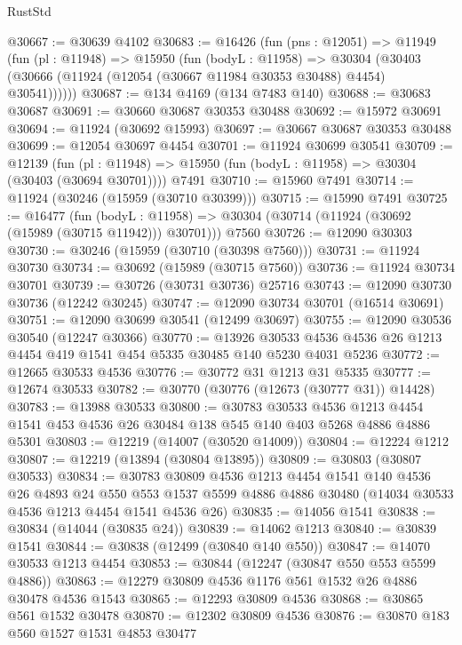 \begin{lexlean}{RustStd}
\begin{coremodule}
{\begin{coremodule}
{{{{{{{{{{{{{{{{{{{{{{{{{{{{{{{{{{{{{{{{{{{{{{{{{{{{{{{{{{{{{{{{{{{{{{{{{{{{{{{{@30667 := @30639 @4102
@30683 := @16426
    (fun (pns : @12051) =>
    @11949
      (fun (pl : @11948) =>
      @15950
        (fun (bodyL : @11958) =>
        @30304 (@30403 (@30666 (@11924 (@12054 (@30667 @11984 @30353 @30488) @4454) @30541))))))
@30687 := @134 @4169 (@134 @7483 @140)
@30688 := @30683 @30687
@30691 := @30660 @30687 @30353 @30488
@30692 := @15972 @30691
@30694 := @11924 (@30692 @15993)
@30697 := @30667 @30687 @30353 @30488
@30699 := @12054 @30697 @4454
@30701 := @11924 @30699 @30541
@30709 := @12139
    (fun (pl : @11948) => @15950 (fun (bodyL : @11958) => @30304 (@30403 (@30694 @30701))))
    @7491
@30710 := @15960 @7491
@30714 := @11924 (@30246 (@15959 (@30710 @30399)))
@30715 := @15990 @7491
@30725 := @16477
    (fun (bodyL : @11958) => @30304 (@30714 (@11924 (@30692 (@15989 (@30715 @11942))) @30701)))
    @7560
@30726 := @12090 @30303
@30730 := @30246 (@15959 (@30710 (@30398 @7560)))
@30731 := @11924 @30730
@30734 := @30692 (@15989 (@30715 @7560))
@30736 := @11924 @30734 @30701
@30739 := @30726 (@30731 @30736) @25716
@30743 := @12090 @30730 @30736 (@12242 @30245)
@30747 := @12090 @30734 @30701 (@16514 @30691)
@30751 := @12090 @30699 @30541 (@12499 @30697)
@30755 := @12090 @30536 @30540 (@12247 @30366)
@30770 := @13926
    @30533
    @4536
    @4536
    @26
    @1213
    @4454
    @419
    @1541
    @454
    @5335
    @30485
    @140
    @5230
    @4031
    @5236
@30772 := @12665 @30533 @4536
@30776 := @30772 @31 @1213 @31 @5335
@30777 := @12674 @30533
@30782 := @30770 (@30776 (@12673 (@30777 @31)) @14428)
@30783 := @13988 @30533
@30800 := @30783
    @30533
    @4536
    @1213
    @4454
    @1541
    @453
    @4536
    @26
    @30484
    @138
    @545
    @140
    @403
    @5268
    @4886
    @4886
    @5301
@30803 := @12219 (@14007 (@30520 @14009))
@30804 := @12224 @1212
@30807 := @12219 (@13894 (@30804 @13895))
@30809 := @30803 (@30807 @30533)
@30834 := @30783
    @30809
    @4536
    @1213
    @4454
    @1541
    @140
    @4536
    @26
    @4893
    @24
    @550
    @553
    @1537
    @5599
    @4886
    @4886
    @30480
    (@14034 @30533 @4536 @1213 @4454 @1541 @4536 @26)
@30835 := @14056 @1541
@30838 := @30834 (@14044 (@30835 @24))
@30839 := @14062 @1213
@30840 := @30839 @1541
@30844 := @30838 (@12499 (@30840 @140 @550))
@30847 := @14070 @30533 @1213 @4454
@30853 := @30844 (@12247 (@30847 @550 @553 @5599 @4886))
@30863 := @12279 @30809 @4536 @1176 @561 @1532 @26 @4886 @30478 @4536 @1543
@30865 := @12293 @30809 @4536
@30868 := @30865 @561 @1532 @30478
@30870 := @12302 @30809 @4536
@30876 := @30870 @183 @560 @1527 @1531 @4853 @30477
}}}}}}}}}}}}}}}}}}}}}}}}}}}}}}}}}}}}}}}}}}}}}}}}}}}}}}}}}}}}}}}}}}}}}}}}}}}}}}}}
\end{coremodule}}
\end{coremodule}
\end{lexlean}
